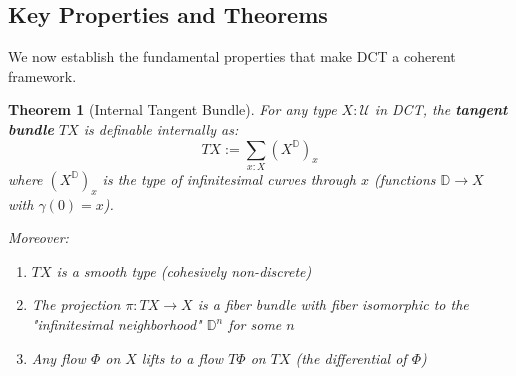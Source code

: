 \documentclass[11pt]{article}
\newtheorem{theorem}{Theorem}[section]
\theoremstyle{definition}
\begin{document}
\subsection{Key Properties and Theorems}

We now establish the fundamental properties that make DCT a coherent framework.

\begin{theorem}[Internal Tangent Bundle]
\label{thm:tangent-bundle}
For any type $X : \mathcal{U}$ in DCT, the \textbf{tangent bundle} $TX$ is definable internally as:
\[
TX := \sum_{x : X} (X^{\mathbb{D}})_x
\]
where $(X^{\mathbb{D}})_x$ is the type of infinitesimal curves through $x$ (functions $\mathbb{D} \to X$ with $\gamma(0) = x$).

Moreover:
\begin{enumerate}
\item $TX$ is a smooth type (cohesively non-discrete)
\item The projection $\pi : TX \to X$ is a fiber bundle with fiber isomorphic to the "infinitesimal neighborhood" $\mathbb{D}^n$ for some $n$
\item Any flow $\Phi$ on $X$ lifts to a flow $T\Phi$ on $TX$ (the differential of $\Phi$)
\end{enumerate}
\end{theorem}
\end{document}
